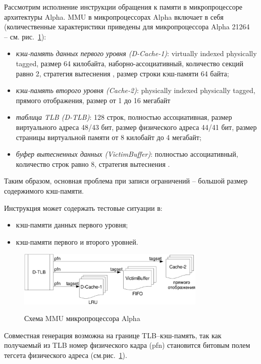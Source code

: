 Рассмотрим исполнение инструкции обращения к памяти в
микропроцессоре архитектуры Alpha. MMU в микропроцессорах Alpha
включает в себя  (количественные характеристики приведены для
микропроцессора Alpha 21264~\cite{HennessyPatterson3rd} -- см.
рис.~\ref{alpha_mmu_scheme}):
\begin{itemize}
  \item \emph{кэш-память данных первого уровня (D-Cache-1)}:
  virtually indexed physically tagged, размер 64 килобайта,
  наборно-ассоциативный, количество секций равно 2, стратегия вытеснения
  \LRU, размер строки кэш-памяти 64 байта;
  \item \emph{кэш-память второго уровня (Cache-2)}: physically
  indexed physically tagged, прямого отображения, размер от 1 до 16
  мегабайт
  \item \emph{таблица TLB (D-TLB)}: 128 строк, полностью
  ассоциативная, размер виртуального адреса 48/43 бит, размер физического адреса
  44/41 бит, размер страницы виртуальной памяти от 8 килобайт до 4
  мегабайт;
  \item \emph{буфер вытесненных данных (VictimBuffer)}: полностью
  ассоциативный, количество строк равно 8, стратегия
  вытеснения \FIFO.
\end{itemize}
Таким образом, основная проблема при записи ограничений -- большой
размер содержимого кэш-памяти.

Инструкция может содержать тестовые ситуации в:
\begin{itemize}
  \item кэш-памяти данных первого уровня;
  \item кэш-памяти первого и второго уровней.
\end{itemize}

\begin{figure}[h] \center
  \includegraphics[width=0.8\textwidth]{4.analysis/alpha}\\
  \caption{Схема MMU микропроцессора Alpha}\label{alpha_mmu_scheme}
\end{figure}

Совместная генерация возможна на границе TLB--кэш-память, так как
получаемый из TLB номер физического кадра (pfn) становится битовым
полем тегсета физического адреса (см.рис.~\ref{alpha_mmu_scheme}).



